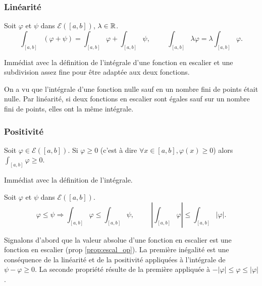 \subsubsection{Linéarité}
\begin{propn}
Soit $\varphi$ et $\psi$ dans $\mathcal{E}([a,b])$, $\lambda\in \mathbb{R}$. 
\[
 \int_{[a,b]}\left( \varphi + \psi\right) = \int_{[a,b]} \varphi + \int_{[a,b]} \psi, \hspace{1cm} \int_{[a,b]}\lambda \varphi = \lambda \int_{[a,b]}\varphi.
\]
\end{propn}
\begin{demo}
 Immédiat avec la définition de l'intégrale d'une fonction en escalier et une subdivision assez fine pour être adaptée aux deux fonctions.
\end{demo}
\begin{rem}
 On a vu que l'intégrale d'une fonction nulle sauf en un nombre fini de points était nulle. Par linéarité, si deux fonctions en escalier sont égales sauf sur un nombre fini de points, elles ont la même intégrale.
\end{rem}
 
\subsubsection{Positivité}
\begin{propn}
 Soit $\varphi \in \mathcal{E}([a,b])$. Si $\varphi \geq 0$ (c'est à dire $\forall x \in[a,b], \varphi(x) \geq 0$) alors $\int_{[a,b]}\varphi \geq 0$.
\end{propn}
\begin{demo}
 Immédiat avec la définition de l'intégrale.
\end{demo}
\begin{propn}
 Soit $\varphi$ et $\psi$ dans $\mathcal{E}([a,b])$.
\[
 \varphi \leq \psi \Rightarrow \int_{[a,b]}\varphi \leq \int_{[a,b]}\psi, \hspace{1cm} \left|\int_{[a,b]}\varphi \right| \leq \int_{[a,b]}|\varphi|.
\]
\end{propn}
\begin{demo}
 Signalons d'abord que la valeur absolue d'une fonction en escalier est une fonction en escalier (prop \ref{prop:escal_op}).\newline
 La première inégalité est une conséquence de la linéarité et de la positivité appliquées à l'intégrale de $\psi - \varphi\geq 0$. La seconde propriété résulte de la première appliquée à $-|\varphi| \leq \varphi \leq |\varphi|$.  
\end{demo}



